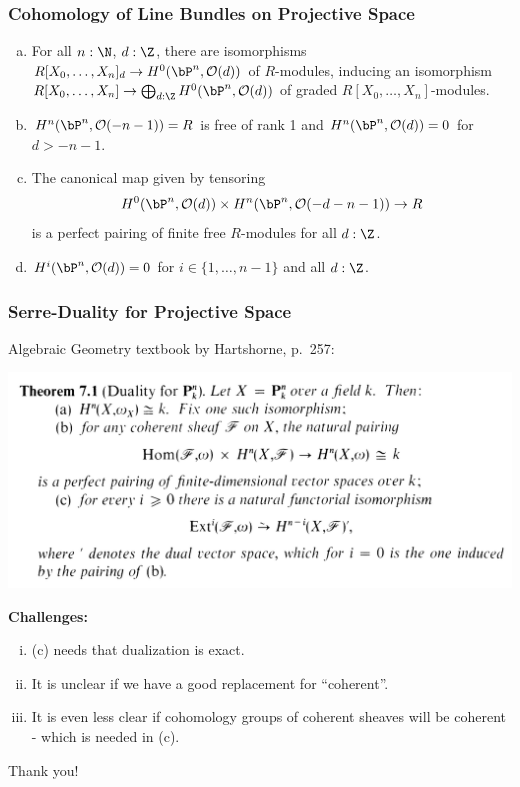 \documentclass{beamer}
\begin{document}
\begin{frame}
  \frametitle{Cohomology of Line Bundles on Projective Space}
\begin{theorem}
  \label{calculate-cohomology-twisting-sheaves}
  \begin{enumerate}[(a)]
  \item \label{calculate-cohomology-twisting-sheaves-a}
  For all $n:\N$, $d:\Z$, there are isomorphisms $R[X_0,\dots,X_n]_d\to H^0(\bP^n,\mathcal O(d))$ of $R$-modules, inducing an isomorphism $R[X_0,\dots,X_n]\to \bigoplus_{d:\Z} H^0(\bP^n,\mathcal O(d))$ of graded $R[X_0,\dots,X_n]$-modules.
  \item \label{calculate-cohomology-twisting-sheaves-b}
        $H^n(\bP^n,\mathcal O(-n-1))=R$ is free of rank 1 and $H^n(\bP^n,\mathcal O(d))=0$ for $d>-n-1$.
  \item \label{calculate-cohomology-twisting-sheaves-c}
    The canonical map given by tensoring
    \[
      H^0(\bP^n,\mathcal O(d)) \times H^n(\bP^n,\mathcal O(-d-n-1))\to R
    \]
    is a perfect pairing of finite free $R$-modules for all $d:\Z$.
  \item $H^i(\bP^n,\mathcal O(d))=0$ for $i\in\{1,\dots,n-1\}$ and all $d:\Z$.
  \end{enumerate}
\end{theorem}
\end{frame}

\begin{frame}
  \frametitle{Serre-Duality for Projective Space}
  Algebraic Geometry textbook by Hartshorne, p.\ 257: 
  \begin{center}
  \includegraphics[keepaspectratio,
                                 width=0.8\paperwidth,
                                 height=\paperheight]{hartshorne1.png}    
  \end{center}
  \pause
  \textbf{Challenges:}
  \begin{enumerate}[(i)]
  \item (c) needs that dualization is exact.
  \item It is unclear if we have a good replacement for ``coherent''.
  \item It is even less clear if cohomology groups of coherent sheaves will be coherent - which is needed in (c).
  \end{enumerate}
\end{frame}

\begin{frame}
  \begin{center}
    Thank you!
  \end{center}
\end{frame}
\end{document}
